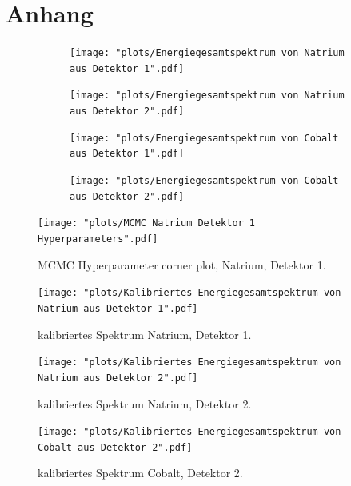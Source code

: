 \documentclass[%
aps,
onecolumn,
11pt,
tightenlines,
nofootinbib,
superscriptaddress,
floatfix,
prd,
]{revtex4-2}
\begin{document}
\section{Anhang}
\label{sec:Anhang}
\begin{figure}[ht]
	\label{fig:initialplotsSo}
	\begin{subfigure}[c]{0.8\textwidth}
		\texttt{[image: "plots/Energiegesamtspektrum von Natrium aus Detektor 1".pdf]}
	\end{subfigure}

	\begin{subfigure}[c]{0.8\textwidth}
		\texttt{[image: "plots/Energiegesamtspektrum von Natrium aus Detektor 2".pdf]}
	\end{subfigure}
\end{figure}

\begin{figure}[ht]
	\label{fig:initialplotsCo}
	\begin{subfigure}[c]{0.8\textwidth}
		\texttt{[image: "plots/Energiegesamtspektrum von Cobalt aus Detektor 1".pdf]}
	\end{subfigure}

	\begin{subfigure}[c]{0.8\textwidth}
		\texttt{[image: "plots/Energiegesamtspektrum von Cobalt aus Detektor 2".pdf]}
	\end{subfigure}

\end{figure}
\begin{figure}		
	\texttt{[image: "plots/MCMC Natrium Detektor 1 Hyperparameters".pdf]}
	\caption{MCMC Hyperparameter corner plot, Natrium, Detektor 1.}
	\label{fig:cornerplot}
\end{figure}

\begin{figure}		
	\texttt{[image: "plots/Kalibriertes Energiegesamtspektrum von Natrium aus Detektor 1".pdf]}
	\caption{kalibriertes Spektrum Natrium, Detektor 1.}
	\label{fig:calibratedsodium1}
\end{figure}
\begin{figure}		
	\texttt{[image: "plots/Kalibriertes Energiegesamtspektrum von Natrium aus Detektor 2".pdf]}
	\caption{kalibriertes Spektrum Natrium, Detektor 2.}
\end{figure}
\begin{figure}		
	\texttt{[image: "plots/Kalibriertes Energiegesamtspektrum von Cobalt aus Detektor 2".pdf]}
	\caption{kalibriertes Spektrum Cobalt, Detektor 2.}
	\label{fig:calibratedcobalt2}
\end{figure}
\end{document}
